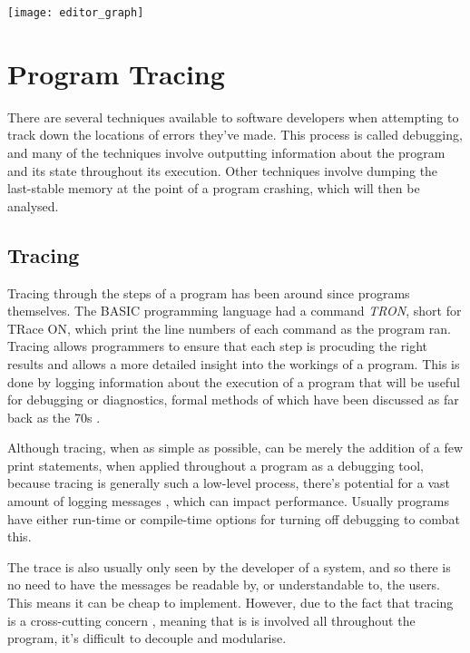 \documentclass{UoYCSproject}
\begin{document}
\texttt{[image: editor\_graph]}


\section{Program Tracing}
There are several techniques available to software developers when attempting to track down the locations of errors they've made. This process is called debugging, and many of the techniques involve outputting information about the program and its state throughout its execution. Other techniques involve dumping the last-stable memory at the point of a program crashing, which will then be analysed. 

\subsection{Tracing}
Tracing through the steps of a program has been around since programs themselves. The BASIC programming language had a command \emph{TRON}, short for TRace ON, which print the line numbers of each command as the program ran. 
Tracing allows programmers to ensure that each step is procuding the right results and allows a more detailed insight into the workings of a program. This is done by logging information about the execution of a program that will be useful for debugging or diagnostics, formal methods of which have been discussed as far back as the 70s \cite{psych_debug, code_walkthroughs}.

Although tracing, when as simple as possible, can be merely the addition of a few print statements, when applied throughout a program as a debugging tool, because tracing is generally such a low-level process, there's potential for a vast amount of logging messages \cite{}, which can impact performance. Usually programs have either run-time or compile-time options for turning off debugging to combat this. %

The trace is also usually only seen by the developer of a system, and so there is no need to have the messages be readable by, or understandable to, the users. This means it can be cheap to implement. However, due to the fact that tracing is a cross-cutting concern \cite{}, meaning that is is involved all throughout the program, it's difficult to decouple and modularise. %
\end{document}
